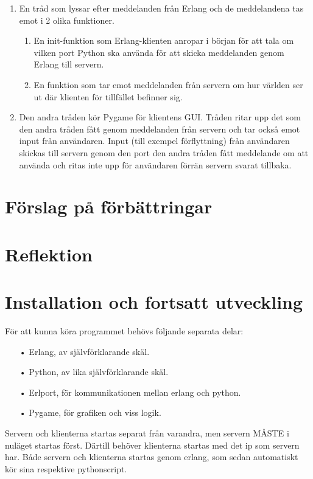\documentclass{scrartcl}
\begin{document}
\begin{enumerate}
\item En tråd som lyssar efter meddelanden från Erlang och de meddelandena tas emot i 2 olika funktioner. 
	\begin{enumerate}
	\item En init-funktion som Erlang-klienten anropar i början för att tala om vilken port Python ska använda för att skicka meddelanden genom Erlang till servern.
	\item En funktion som tar emot meddelanden från servern om hur världen ser ut där klienten för tillfället befinner sig.
	\end{enumerate}
	\smallskip
\item Den andra tråden kör Pygame för klientens GUI. Tråden ritar upp det som den andra tråden fått genom meddelanden från servern och tar också emot input från användaren. Input (till exempel förflyttning) från användaren skickas till servern genom den port den andra tråden fått meddelande om att använda och ritas inte upp för användaren förrän servern svarat tillbaka.
\end{enumerate}

\smallskip
\section{Förslag på förbättringar}

\smallskip
\section{Reflektion}

\smallskip
\section{Installation och fortsatt utveckling}
För att kunna köra programmet behövs följande separata delar:
\begin{enumerate}
\item[•] Erlang, av självförklarande skäl.
\item[•] Python, av lika självförklarande skäl.
\item[•] Erlport, för kommunikationen mellan erlang och python.
\item[•] Pygame, för grafiken och viss logik.
\end{enumerate}
\smallskip

Servern och klienterna startas separat från varandra, men servern MÅSTE i nuläget startas först. Därtill behöver klienterna startas med det ip som servern har. \linebreak
Både servern och klienterna startas genom erlang, som sedan automatiskt kör sina respektive pythonscript.
\end{document}
